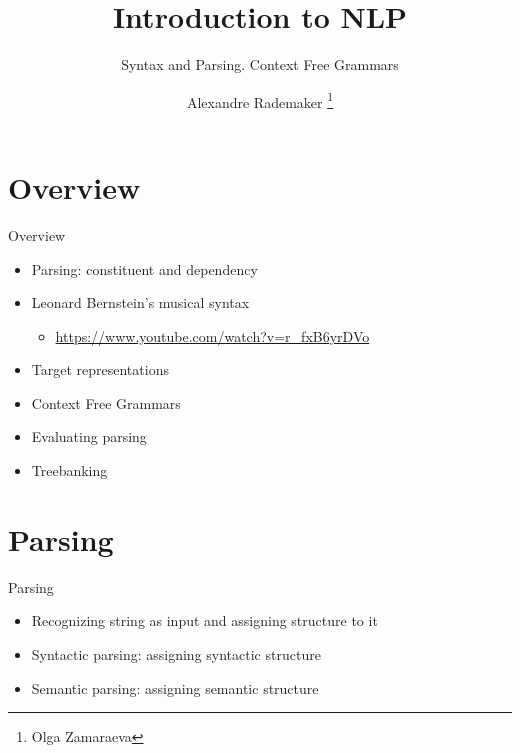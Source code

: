 \documentclass{beamer}
\title{Introduction to NLP}
\subtitle{Syntax and Parsing. Context Free Grammars}
\author{Alexandre Rademaker \thanks{Olga Zamaraeva}}
\institute{FGV/EMAp}
\begin{document}
   
\begin{frame}
  \maketitle
\end{frame}

\section{Overview}

\begin{frame}{Overview}
  \begin{itemize}
  \item Parsing: constituent and dependency
  \item Leonard Bernstein's musical syntax
    \begin{itemize}
    \item \url{https://www.youtube.com/watch?v=r_fxB6yrDVo}
    \end{itemize}
  \item Target representations
  \item Context Free Grammars
  \item Evaluating parsing
  \item Treebanking
  \end{itemize}
\end{frame}

\section{Parsing}

\begin{frame}{Parsing}
  \begin{itemize}
  \item Recognizing string as input and assigning structure to it
  \item Syntactic parsing: assigning syntactic structure
  \item Semantic parsing: assigning semantic structure
  \end{itemize}
\end{frame}
\end{document}

